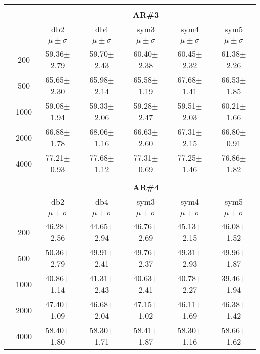\begin{table}[H]
\begin{tabular}{|c|c|c c c c c|}
\\ \midrule
\multicolumn{7}{c}{}\\ 



\cline{3-7}
\multicolumn{2}{c|}{\multirow{3}{*}{}} & \multicolumn{5}{c|}{\textbf{AR\#3}}   \\\cline{3-7} 

\multicolumn{2}{c|}{}  & db2 & db4 & sym3 & sym4 & sym5 \\\cline{3-7}
\multicolumn{2}{c|}{}& $\mu \pm \sigma$ & $\mu \pm \sigma$ & $\mu \pm \sigma$ & $\mu \pm \sigma$ & $\mu \pm \sigma$ \\\hline

\multicolumn{1}{|c|}{ \multirow{5}{*}{\rotatebox[origin=c]{90}{\textbf{Neurônios}}} }
&200	&59.36$\pm$2.79	&59.70$\pm$2.43	&60.40$\pm$2.38	&60.45$\pm$2.32	&61.38$\pm$2.26\\\cline{2-7}
&500	&65.65$\pm$2.30	&65.98$\pm$2.14	&65.58$\pm$1.19	&67.68$\pm$1.41	&66.53$\pm$1.85\\\cline{2-7}
&1000	&59.08$\pm$1.94	&59.33$\pm$2.06	&59.28$\pm$2.47	&59.51$\pm$2.03	&60.21$\pm$1.66\\\cline{2-7}
&2000	&66.88$\pm$1.78	&68.06$\pm$1.16	&66.63$\pm$2.60	&67.31$\pm$2.15	&66.80$\pm$0.91\\\cline{2-7}
&4000	&77.21$\pm$0.93	&77.68$\pm$1.12	&77.31$\pm$0.69	&77.25$\pm$1.46	&76.86$\pm$1.82


\\\midrule 
\multicolumn{7}{c}{}\\ 



\cline{3-7}
\multicolumn{2}{c|}{\multirow{3}{*}{}} & \multicolumn{5}{c|}{\textbf{AR\#4}}   \\\cline{3-7} 

\multicolumn{2}{c|}{}  & db2 & db4 & sym3 & sym4 & sym5 \\\cline{3-7}
\multicolumn{2}{c|}{}& $\mu \pm \sigma$ & $\mu \pm \sigma$ & $\mu \pm \sigma$ & $\mu \pm \sigma$ & $\mu \pm \sigma$ \\\hline

\multicolumn{1}{|c|}{ \multirow{5}{*}{\rotatebox[origin=c]{90}{\textbf{Neurônios}}} }
&200	&46.28$\pm$2.56	&44.65$\pm$2.94	&46.76$\pm$2.69	&45.13$\pm$2.15	&46.08$\pm$1.52\\\cline{2-7}
&500	&50.36$\pm$2.79	&49.91$\pm$2.41	&49.76$\pm$2.37	&49.31$\pm$2.93	&49.96$\pm$1.87\\\cline{2-7}
&1000	&40.86$\pm$1.14	&41.31$\pm$2.43	&40.63$\pm$2.41	&40.78$\pm$2.27	&39.46$\pm$1.94\\\cline{2-7}
&2000	&47.40$\pm$1.09	&46.68$\pm$2.04	&47.15$\pm$1.02	&46.11$\pm$1.69	&46.38$\pm$1.42\\\cline{2-7}
&4000	&58.40$\pm$1.80	&58.30$\pm$1.71	&58.41$\pm$1.87	&58.30$\pm$1.16	&58.66$\pm$1.62

	

\\\midrule
	\end{tabular}

\end{table} %

